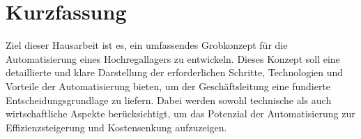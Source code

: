\chapter*{Kurzfassung} %


Ziel dieser Hausarbeit ist es, ein umfassendes Grobkonzept für die Automatisierung eines Hochregallagers zu entwickeln. Dieses Konzept soll eine detaillierte und klare Darstellung der erforderlichen Schritte, Technologien und Vorteile der Automatisierung bieten, um der Geschäftsleitung eine fundierte Entscheidungsgrundlage zu liefern. Dabei werden sowohl technische als auch wirtschaftliche Aspekte berücksichtigt, um das Potenzial der Automatisierung zur Effizienzsteigerung und Kostensenkung aufzuzeigen.

